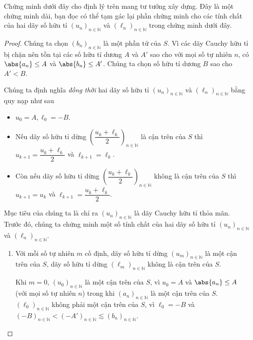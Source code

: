 \noindent Chứng minh dưới đây cho định lý trên mang tư tưởng xây dựng. Đây là một chứng minh dài, bạn đọc có thể tạm gác lại phần chứng minh cho các tính chất của hai dãy số hữu tỉ ${(u_{n})}_{n\in\mathbb{N}}$ và ${(\ell_{n})}_{n\in\mathbb{N}}$ trong chứng minh dưới đây.

\begin{proof}
    Chúng ta chọn ${(b_{n})}_{n\in\mathbb{N}}$ là một phần tử của $S$. Vì các dãy Cauchy hữu tỉ bị chặn nên tồn tại các số hữu tỉ dương $A$ và $A'$ sao cho với mọi số tự nhiên $n$, có $\abs{a_{n}}\leq A$ và $\abs{b_{n}}\leq A'$. Chúng ta chọn số hữu tỉ dương $B$ sao cho $A' < B$.

    Chúng ta định nghĩa \textit{đồng thời} hai dãy số hữu tỉ ${(u_{n})}_{n\in\mathbb{N}}$ và ${(\ell_{n})}_{n\in\mathbb{N}}$ bằng quy nạp như sau
    \begin{itemize}
        \item $u_{0} = A, \ell_{0} = -B$.
        \item Nếu dãy số hữu tỉ dừng ${\left(\dfrac{u_{k}+\ell_{k}}{2}\right)}_{n\in\mathbb{N}}$ là cận trên của $S$ thì $u_{k+1} = \dfrac{u_{k} + \ell_{k}}{2}$ và $\ell_{k+1} = \ell_{k}$.
        \item Còn nếu dãy số hữu tỉ dừng ${\left(\dfrac{u_{k}+\ell_{k}}{2}\right)}_{n\in\mathbb{N}}$ không là cận trên của $S$ thì $u_{k+1} = u_{k}$ và $\ell_{k+1} = \dfrac{u_{k} + \ell_{k}}{2}$.
    \end{itemize}

    Mục tiêu của chúng ta là chỉ ra ${(u_{n})}_{n\in\mathbb{N}}$ là dãy Cauchy hữu tỉ thỏa mãn. Trước đó, chúng ta chứng minh một số tính chất của hai dãy số hữu tỉ ${(u_{n})}_{n\in\mathbb{N}}$ và ${(\ell_{n})}_{n\in\mathbb{N}}$.

    \begin{enumerate}[label={\textbf{Tính chất \arabic*.}},itemindent=1.7cm]
        \item Với mỗi số tự nhiên $m$ cố định, dãy số hữu tỉ dừng ${(u_{m})}_{n\in\mathbb{N}}$ là một cận trên của $S$, dãy số hữu tỉ dừng ${(\ell_{m})}_{n\in\mathbb{N}}$ không là cận trên của $S$.

              Khi $m = 0$, ${(u_{0})}_{n\in\mathbb{N}}$ là một cận trên của $S$, vì $u_{0} = A$ và $\abs{a_{n}}\leq A$ (với mọi số tự nhiên $n$) trong khi ${(a_{n})}_{n\in\mathbb{N}}$ là một cận trên của $S$. ${(\ell_{0})}_{n\in\mathbb{N}}$ không phải một cận trên của $S$, vì $\ell_{0} = -B$ và ${(-B)}_{n\in\mathbb{N}} < {(-A')}_{n\in\mathbb{N}}\lesssim {(b_{n})}_{n\in\mathbb{N}}$.


\end{enumerate}
\end{proof}
